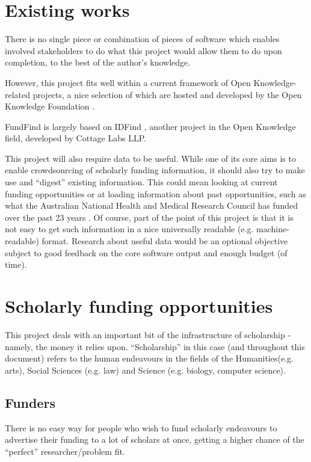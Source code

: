 \section{Existing works}
There is no single piece or combination of pieces of software which enables involved stakeholders to do what this project would allow them to do upon completion, to the best of the author's knowledge.

However, this project fits well within a current framework of Open Knowledge-related projects, a nice selection of which are hosted and developed by the Open Knowledge Foundation \cite{okfn-labs} \cite{okfn-github}.

FundFind is largely based on IDFind \cite{idfind}, another project in the Open Knowledge field, developed by Cottage Labs LLP.

This project will also require data to be useful. While one of its core aims is to enable crowdsourcing of scholarly funding information, it should also try to make use and ``digest'' existing information. This could mean looking at current funding opportunities \cite{rcuk-india} \cite{ahrc-opps} \cite{bbsrc-opps} \cite{epsrc-opps} or at loading information about past opportunities, such as what the Australian National Health and Medical Research Council has funded over the past 23 years \cite{au-nhmrc}. Of course, part of the point of this project is that it is not easy to get such information in a nice universally readable (e.g. machine-readable) format. Research about useful data would be an optional objective subject to good feedback on the core software output and enough budget (of time).


\section{Scholarly funding opportunities}
This project deals with an important bit of the infrastructure of scholarship - namely, the money it relies upon. ``Scholarship'' in this case (and throughout this document) refers to the human endeavours in the fields of the Humanities(e.g. arts), Social Sciences (e.g. law) and Science (e.g. biology, computer science).



\subsection{Funders}
There is no easy way for people who wish to fund scholarly endeavours to advertise their funding to a lot of scholars at once, getting a higher chance of the ``perfect'' researcher/problem fit.

